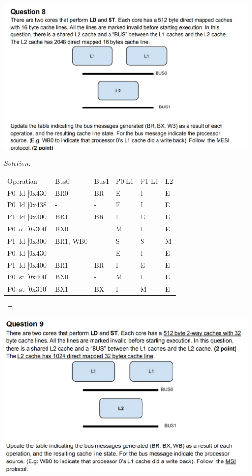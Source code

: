 \documentclass[12pt]{article}
\begin{document}
\includegraphics[scale=0.37]{q8.png}\\
\begin{proof}[Solution]
	\ \\
	    \begin{tabular}{llllll}
		Operation & Bus0  & Bus1  & P0 L1 & P1 L1 & L2 \\
		P0: ld [0x430] & BR0   & BR    & E     & I     & E \\
		P0: ld [0x438] & -     & -     & E     & I     & E \\
		P1: ld [0x300] & BR1   & BR    & I     & E     & E \\
		P0: st [0x300] & BX0   & -     & M     & I     & E \\
		P1: ld [0x300] & BR1, WB0 & -     & S     & S     & M \\
		P0: ld [0x430] & -     & -     & E     & I     & E \\
		P1: ld [0x400] & BR1   & BR    & I     & E     & E \\
		P0: st [0x400] & BX0   & -     & M     & I     & E \\
		P0: st [0x310] & BX1   & BX    & I     & M     & E \\
	\end{tabular}%
\end{proof}
\includegraphics[scale=0.37]{q9.png}\\
\end{document}
